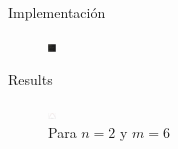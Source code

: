 \begin{frame}{Implementación}
    \begin{figure}
        \centering
        \includegraphics[width=8]{p7-code2.png}
        \caption{}
        \label{fig:enter-label}
    \end{figure}
\end{frame}
\begin{frame}{Results}
    \begin{figure}
        \centering
        \includegraphics[width=8]{p7-Aprox-discreta.png}
        \caption{Para $n=2$ y $m=6$}
        \label{fig:enter-label}
    \end{figure}
\end{frame}
